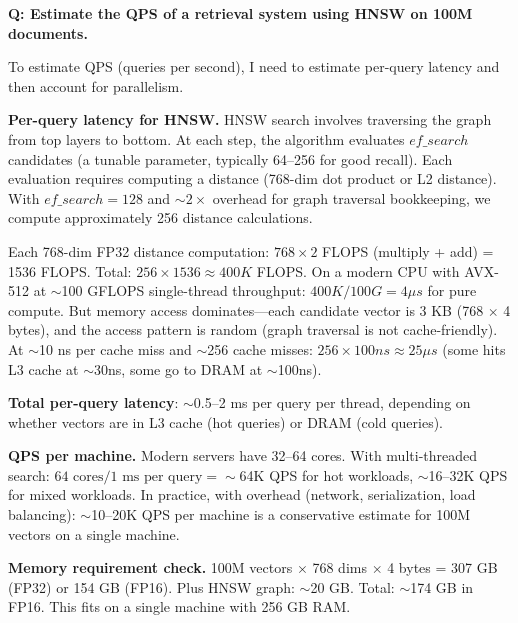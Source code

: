 \begin{interviewq}
\end{interviewq}


\begin{interviewq}
\textbf{Q: Estimate the QPS of a retrieval system using HNSW on 100M documents.}

 \quad {} \quad \badgefreq{\freqmed}

\stronganswer

To estimate QPS (queries per second), I need to estimate per-query latency and then account for parallelism.

\textbf{Per-query latency for HNSW.} HNSW search involves traversing the graph from top layers to bottom. At each step, the algorithm evaluates $ef\_search$ candidates (a tunable parameter, typically 64--256 for good recall). Each evaluation requires computing a distance (768-dim dot product or L2 distance). With $ef\_search = 128$ and $\sim 2 \times$ overhead for graph traversal bookkeeping, we compute approximately 256 distance calculations.

Each 768-dim FP32 distance computation: $768 \times 2$ FLOPS (multiply + add) = 1536 FLOPS. Total: $256 \times 1536 \approx 400K$ FLOPS. On a modern CPU with AVX-512 at $\sim$100 GFLOPS single-thread throughput: $400K / 100G = 4 \mu s$ for pure compute. But memory access dominates---each candidate vector is 3 KB (768 $\times$ 4 bytes), and the access pattern is random (graph traversal is not cache-friendly). At $\sim$10 ns per cache miss and $\sim$256 cache misses: $256 \times 100ns \approx 25 \mu s$ (some hits L3 cache at $\sim$30ns, some go to DRAM at $\sim$100ns).

\textbf{Total per-query latency}: $\sim$0.5--2 ms per query per thread, depending on whether vectors are in L3 cache (hot queries) or DRAM (cold queries).

\textbf{QPS per machine.} Modern servers have 32--64 cores. With multi-threaded search: $64 \text{ cores} / 1 \text{ ms per query} = \sim$64K QPS for hot workloads, $\sim$16--32K QPS for mixed workloads. In practice, with overhead (network, serialization, load balancing): $\sim$10--20K QPS per machine is a conservative estimate for 100M vectors on a single machine.

\textbf{Memory requirement check.} 100M vectors $\times$ 768 dims $\times$ 4 bytes = 307 GB (FP32) or 154 GB (FP16). Plus HNSW graph: $\sim$20 GB. Total: $\sim$174 GB in FP16. This fits on a single machine with 256 GB RAM.


\end{interviewq}
